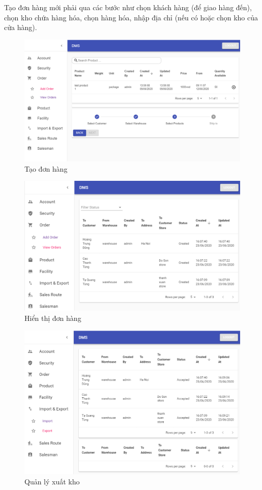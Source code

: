 Tạo đơn hàng mới phải qua các bước như chọn khách hàng
(để giao hàng đến), chọn kho chứa hàng hóa, chọn hàng
hóa, nhập địa chỉ (nếu có hoặc chọn kho của cửa hàng).
\begin{figure}[H]
\centering
\includegraphics[width=15cm]{images/demo/add-order.png}
\caption{Tạo đơn hàng}
\end{figure}

\begin{figure}[H]
\centering
\includegraphics[width=15cm]{images/demo/view-orders.png}
\caption{Hiển thị đơn hàng}
\end{figure}

\begin{figure}[H]
\centering
\includegraphics[width=15cm]{images/demo/view-export.png}
\caption{Quản lý xuất kho}
\end{figure}

